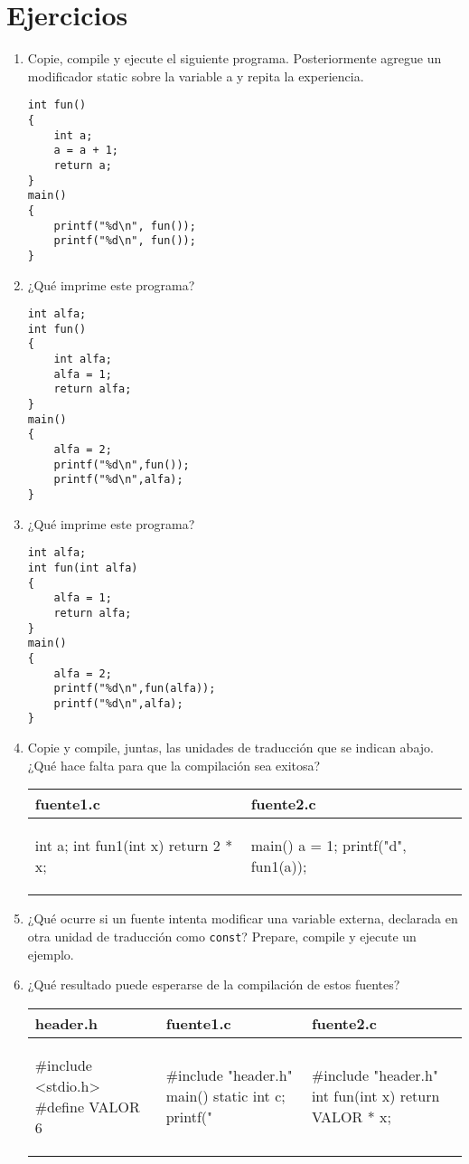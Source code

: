 \section{Ejercicios}
\begin{enumerate}
	\item Copie, compile y ejecute el siguiente programa. Posteriormente agregue un modificador static sobre
la variable a y repita la experiencia.
\begin{lstlisting}
int fun()
{
	int a;
	a = a + 1;
	return a;
}
main()
{
	printf("%d\n", fun());
	printf("%d\n", fun());
}
\end{lstlisting}
\item ¿Qué imprime este programa?
\begin{lstlisting}
int alfa;
int fun()
{
	int alfa;
	alfa = 1;
	return alfa;
}
main()
{
	alfa = 2;
	printf("%d\n",fun());
	printf("%d\n",alfa);
}
\end{lstlisting}
\item ¿Qué imprime este programa?
\begin{lstlisting}
int alfa;
int fun(int alfa)
{
	alfa = 1;
	return alfa;
}
main()
{
	alfa = 2;
	printf("%d\n",fun(alfa));
	printf("%d\n",alfa);
}
\end{lstlisting}
 \item Copie y compile, juntas, las unidades de traducción que se indican abajo. ¿Qué hace falta para que
la compilación sea exitosa?

	
\begin{tabular}{p{4cm}|p{5cm}}
fuente1.c & fuente2.c\\
\hline
\begin{codecell}
int a;
int fun1(int x)
{
	return 2 * x;
}
\end{codecell}
&
\begin{codecell}
main()
{
	a = 1;
	printf("d\n", fun1(a));
}
\end{codecell}
\\
\end{tabular} 

\item ¿Qué ocurre si un fuente intenta modificar una variable externa, declarada en otra unidad de
traducción como \texttt{const}? Prepare, compile y ejecute un ejemplo.
\item ¿Qué resultado puede esperarse de la compilación de estos fuentes?

\begin{tabular}{p{4cm}|p{5cm}|p{4cm}}
header.h & fuente1.c &fuente2.c\\
\hline
\begin{codecell}
#include <stdio.h>
#define VALOR 6
\end{codecell}
&
\begin{codecell}
#include "header.h"
main()
{
	static int c;
	printf("%
}
\end{codecell}
&
\begin{codecell}
#include "header.h"
int fun(int x)
{
	return VALOR * x;
}
\end{codecell}
\\
\end{tabular}


\end{enumerate}
